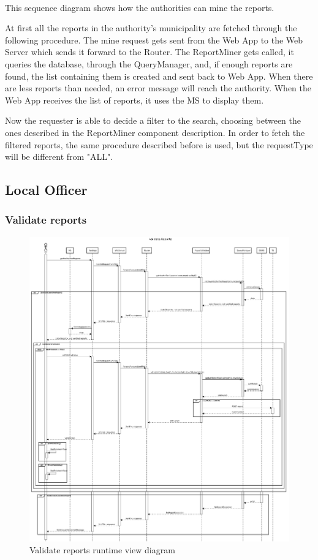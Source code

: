 					\paragraph{}
						This sequence diagram shows how the authorities can mine the reports. 
						
						At first all the reports in the authority's municipality are fetched through the following procedure. The mine request gets sent from the Web App to the Web Server which sends it forward to the Router. The ReportMiner gets called, it queries the database, through the QueryManager, and, if enough reports are found, the list containing them is created and sent back to Web App. When there are less reports than needed, an error message will reach the authority. When the Web App receives the list of reports, it uses the MS to display them. 
						
						Now the requester is able to decide a filter to the search, choosing between the ones described in the ReportMiner component description. In order to fetch the filtered reports, the same procedure described before is used, but the requestType will be different from "ALL".
			\clearpage
			\subsection{Local Officer}
				\subsubsection{Validate reports}
					\begin{figure}[!h]
						\centering
						\includegraphics[width=\textwidth]{images/DD2/RuntimeView/Authority/LO/ValidateReports.pdf}
						\caption{Validate reports runtime view diagram}
					\end{figure}
